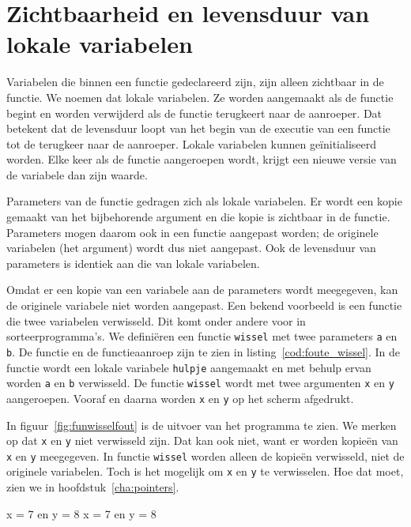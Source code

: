 \section{Zichtbaarheid en levensduur van lokale variabelen}
Variabelen die binnen een functie gedeclareerd zijn, zijn alleen zichtbaar in de functie. We noemen dat lokale variabelen. Ze worden aangemaakt als de functie begint en worden verwijderd als de functie terugkeert naar de aanroeper. Dat betekent dat de levensduur loopt van het begin van de executie van een functie tot de terugkeer naar de aanroeper. Lokale variabelen kunnen geïnitialiseerd worden. Elke keer als de functie aangeroepen wordt, krijgt een nieuwe versie van de variabele dan zijn waarde.

Parameters van de functie gedragen zich als lokale variabelen. Er wordt een kopie gemaakt van het bijbehorende argument en die kopie is zichtbaar in de functie. Parameters mogen daarom ook in een functie aangepast worden; de originele variabelen (het argument) wordt dus niet aangepast. Ook de levensduur van parameters is identiek aan die van lokale variabelen.

Omdat er een kopie van een variabele aan de parameters wordt meegegeven, kan de originele variabele niet worden aangepast. Een bekend voorbeeld is een functie die twee variabelen verwisseld. Dit komt onder andere voor in sorteerprogramma's. We definiëren een functie \texttt{wissel} met twee parameters \texttt{a} en \texttt{b}. De functie en de functieaanroep zijn te zien in listing~\ref{cod:foute_wissel}. In de functie wordt een lokale variabele \texttt{hulpje} aangemaakt en met behulp ervan worden \texttt{a} en \texttt{b} verwisseld. De functie \texttt{wissel} wordt met twee argumenten \texttt{x} en \texttt{y} aangeroepen. Vooraf en daarna worden \texttt{x} en \texttt{y} op het scherm afgedrukt.


In figuur~\ref{fig:funwisselfout} is de uitvoer van het programma te zien. We merken op dat \texttt{x} en \texttt{y} niet verwisseld zijn. Dat kan ook niet, want er worden kopieën van \texttt{x} en \texttt{y} meegegeven. In functie \texttt{wissel} worden alleen de kopieën verwisseld, niet de originele variabelen.
Toch is het mogelijk om \texttt{x} en \texttt{y} te verwisselen. Hoe dat moet, zien we in hoofdstuk~\ref{cha:pointers}.

\begin{dosbox}[title=Uitvoer van de functie \texttt{wissel}.,label=fig:funwisselfout]
x = 7 en y = 8
x = 7 en y = 8
\end{dosbox}

